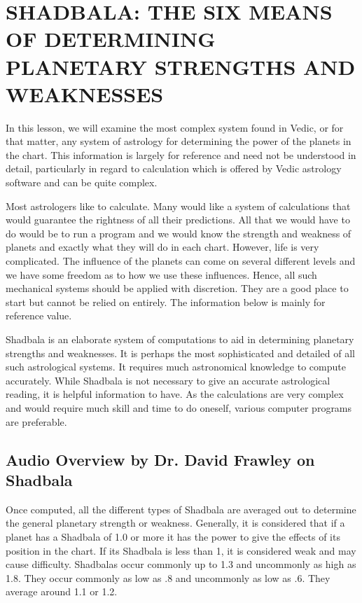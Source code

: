 \section{SHADBALA: THE SIX MEANS OF DETERMINING PLANETARY STRENGTHS AND WEAKNESSES}
 

In this lesson, we will examine the most complex system found in Vedic, or for that matter, any system of astrology for determining the power of the planets in the chart. This information is largely for reference and need not be understood in detail, particularly in regard to calculation which is offered by Vedic astrology software and can be quite complex.

 

Most astrologers like to calculate. Many would like a system of calculations that would guarantee the rightness of all their predictions. All that we would have to do would be to run a program and we would know the strength and weakness of planets and exactly what they will do in each chart. However, life is very complicated. The influence of the planets can come on several different levels and we have some freedom as to how we use these influences. Hence, all such mechanical systems should be applied with discretion. They are a good place to start but cannot be relied on entirely. The information below is mainly for reference value.

 



 

Shadbala is an elaborate system of computations to aid in determining planetary strengths and weaknesses. It is perhaps the most sophisticated and detailed of all such astrological systems. It requires much astronomical knowledge to compute accurately. While Shadbala is not necessary to give an accurate astrological reading, it is helpful information to have. As the calculations are very complex and would require much skill and time to do oneself, various computer programs are preferable.

\subsection{\textbf{Audio Overview by Dr. David Frawley on Shadbala}}

Once computed, all the different types of Shadbala are averaged out to determine the general planetary strength or weakness. Generally, it is considered that if a planet has a Shadbala of 1.0 or more it has the power to give the effects of its position in the chart. If its Shadbala is less than 1, it is considered weak and may cause difficulty. Shadbalas occur commonly up to 1.3 and uncommonly as high as 1.8. They occur commonly as low as .8 and uncommonly as low as .6. They average around 1.1 or 1.2.

